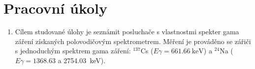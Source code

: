 \documentclass[a4paper]{article}
\author{Vladislav Wohlrath}
\newcommand{\pr}[2]{$^{\num{#1}}$#2}
\newcommand{\kev}[1]{\SI{#1}{\keV}}
\begin{document}
\begin{titlepage}

\end{titlepage}

\section*{Pracovní úkoly}
\begin{enumerate}
\item Cílem studované úlohy je seznámit posluchače s vlastnostmi spekter gama záření získaných polovodičovým spektrometrem. Měření je prováděno se zářiči s jednoduchým spektrem gama záření:  \pr{137}{Cs} ($E\gamma = \kev{661.66}$) a \pr{24}{Na} ($E\gamma = \num{1368.63}$ a {\kev{2754.03}}).
\end{enumerate}










\printbibliography[title={Seznam použité literatury}]
\end{document}
